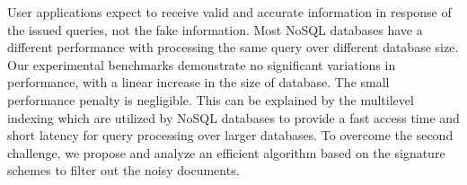 User applications expect to receive valid and accurate information in response of the issued queries, not the fake information. Most NoSQL databases have a different performance with processing the same query over different database size. Our experimental benchmarks demonstrate no significant variations in performance, with a linear increase in the size of database. The small performance penalty is negligible. This can be explained by the multilevel indexing which are utilized by NoSQL databases to provide a fast access time and short latency for query processing over larger databases. To overcome the second challenge, we propose and analyze an efficient algorithm based on the signature schemes to filter out the noisy documents.


